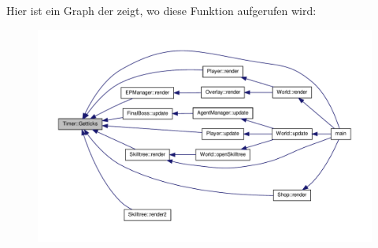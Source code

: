 Hier ist ein Graph der zeigt, wo diese Funktion aufgerufen wird\-:
\nopagebreak
\begin{figure}[H]
\begin{center}
\leavevmode
\includegraphics[width=350pt]{class_timer_a419af9cdb3d77331954a78a9c877de11_icgraph}
\end{center}
\end{figure}



